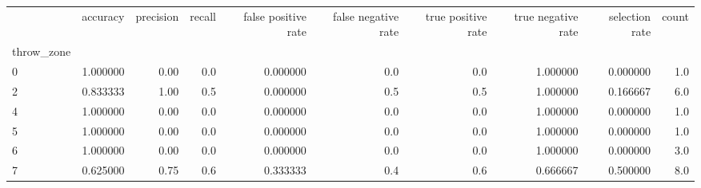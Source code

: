 \begin{tabular}{lrrrrrrrrr}
\toprule
{} &  accuracy &  precision &  recall &  false positive rate &  false negative rate &  true positive rate &  true negative rate &  selection rate &  count \\
throw\_zone &           &            &         &                      &                      &                     &                     &                 &        \\
\midrule
0          &  1.000000 &       0.00 &     0.0 &             0.000000 &                  0.0 &                 0.0 &            1.000000 &        0.000000 &    1.0 \\
2          &  0.833333 &       1.00 &     0.5 &             0.000000 &                  0.5 &                 0.5 &            1.000000 &        0.166667 &    6.0 \\
4          &  1.000000 &       0.00 &     0.0 &             0.000000 &                  0.0 &                 0.0 &            1.000000 &        0.000000 &    1.0 \\
5          &  1.000000 &       0.00 &     0.0 &             0.000000 &                  0.0 &                 0.0 &            1.000000 &        0.000000 &    1.0 \\
6          &  1.000000 &       0.00 &     0.0 &             0.000000 &                  0.0 &                 0.0 &            1.000000 &        0.000000 &    3.0 \\
7          &  0.625000 &       0.75 &     0.6 &             0.333333 &                  0.4 &                 0.6 &            0.666667 &        0.500000 &    8.0 \\
\bottomrule
\end{tabular}
